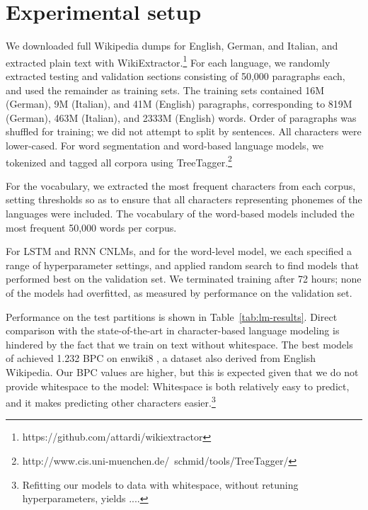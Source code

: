 \section{Experimental setup}
\label{sec:setup}

We downloaded full Wikipedia dumps for English, German, and Italian, and extracted plain text with WikiExtractor.\footnote{https://github.com/attardi/wikiextractor}
For each language, we randomly extracted testing and validation sections consisting of 50,000 paragraphs each, and used the remainder as training sets.
The training sets contained 16M (German), 9M (Italian), and 41M (English) paragraphs, corresponding to 819M (German), 463M (Italian), and 2333M (English) words.
Order of paragraphs was shuffled for training; we did not attempt to split by sentences.
All characters were lower-cased.
For word segmentation and word-based language models, we tokenized and tagged all corpora using TreeTagger.\footnote{http://www.cis.uni-muenchen.de/~schmid/tools/TreeTagger/}

For the vocabulary, we extracted the most frequent characters from each corpus, setting thresholds so as to ensure that all characters representing phonemes of the languages were included.
The vocabulary of the word-based models included the most frequent 50,000 words per corpus.


For LSTM and RNN CNLMs, and for the word-level model, we each specified a range of hyperparameter settings, and applied random search to find models that performed best on the validation set.
We terminated training after 72 hours; none of the models had overfitted, as measured by performance on the validation set.

Performance on the test partitions is shown in Table~\ref{tab:lm-results}.
Direct comparison with the state-of-the-art in character-based language modeling is hindered by the fact that we train on text without whitespace.
The best models of \cite{merity2018analysis} achieved 1.232 BPC on enwiki8 \cite{hutter2018}, a dataset also derived from English Wikipedia. %
Our BPC values are higher, but this is expected given that we do not provide whitespace to the model: Whitespace is both relatively easy to predict, and it makes predicting other characters easier.\footnote{Refitting our models to data with whitespace, without retuning hyperparameters, yields ....}

